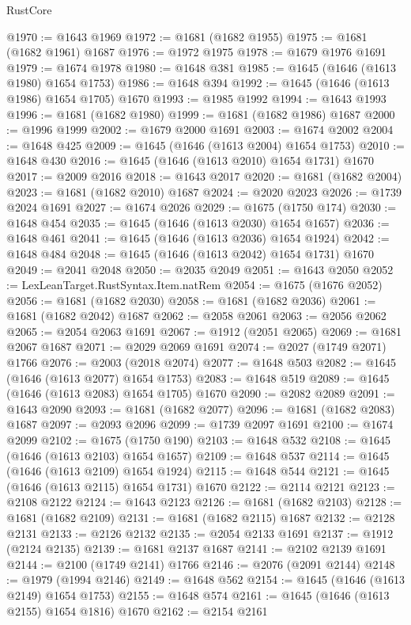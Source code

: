 \begin{lexlean}{RustCore}
\begin{coremodule}
@1970 := @1643 @1969
@1972 := @1681 (@1682 @1955)
@1975 := @1681 (@1682 @1961) @1687
@1976 := @1972 @1975
@1978 := @1679 @1976 @1691
@1979 := @1674 @1978
@1980 := @1648 @381
@1985 := @1645 (@1646 (@1613 @1980) @1654 @1753)
@1986 := @1648 @394
@1992 := @1645 (@1646 (@1613 @1986) @1654 @1705) @1670
@1993 := @1985 @1992
@1994 := @1643 @1993
@1996 := @1681 (@1682 @1980)
@1999 := @1681 (@1682 @1986) @1687
@2000 := @1996 @1999
@2002 := @1679 @2000 @1691
@2003 := @1674 @2002
@2004 := @1648 @425
@2009 := @1645 (@1646 (@1613 @2004) @1654 @1753)
@2010 := @1648 @430
@2016 := @1645 (@1646 (@1613 @2010) @1654 @1731) @1670
@2017 := @2009 @2016
@2018 := @1643 @2017
@2020 := @1681 (@1682 @2004)
@2023 := @1681 (@1682 @2010) @1687
@2024 := @2020 @2023
@2026 := @1739 @2024 @1691
@2027 := @1674 @2026
@2029 := @1675 (@1750 @174)
@2030 := @1648 @454
@2035 := @1645 (@1646 (@1613 @2030) @1654 @1657)
@2036 := @1648 @461
@2041 := @1645 (@1646 (@1613 @2036) @1654 @1924)
@2042 := @1648 @484
@2048 := @1645 (@1646 (@1613 @2042) @1654 @1731) @1670
@2049 := @2041 @2048
@2050 := @2035 @2049
@2051 := @1643 @2050
@2052 := LexLeanTarget.RustSyntax.Item.natRem
@2054 := @1675 (@1676 @2052)
@2056 := @1681 (@1682 @2030)
@2058 := @1681 (@1682 @2036)
@2061 := @1681 (@1682 @2042) @1687
@2062 := @2058 @2061
@2063 := @2056 @2062
@2065 := @2054 @2063 @1691
@2067 := @1912 (@2051 @2065)
@2069 := @1681 @2067 @1687
@2071 := @2029 @2069 @1691
@2074 := @2027 (@1749 @2071) @1766
@2076 := @2003 (@2018 @2074)
@2077 := @1648 @503
@2082 := @1645 (@1646 (@1613 @2077) @1654 @1753)
@2083 := @1648 @519
@2089 := @1645 (@1646 (@1613 @2083) @1654 @1705) @1670
@2090 := @2082 @2089
@2091 := @1643 @2090
@2093 := @1681 (@1682 @2077)
@2096 := @1681 (@1682 @2083) @1687
@2097 := @2093 @2096
@2099 := @1739 @2097 @1691
@2100 := @1674 @2099
@2102 := @1675 (@1750 @190)
@2103 := @1648 @532
@2108 := @1645 (@1646 (@1613 @2103) @1654 @1657)
@2109 := @1648 @537
@2114 := @1645 (@1646 (@1613 @2109) @1654 @1924)
@2115 := @1648 @544
@2121 := @1645 (@1646 (@1613 @2115) @1654 @1731) @1670
@2122 := @2114 @2121
@2123 := @2108 @2122
@2124 := @1643 @2123
@2126 := @1681 (@1682 @2103)
@2128 := @1681 (@1682 @2109)
@2131 := @1681 (@1682 @2115) @1687
@2132 := @2128 @2131
@2133 := @2126 @2132
@2135 := @2054 @2133 @1691
@2137 := @1912 (@2124 @2135)
@2139 := @1681 @2137 @1687
@2141 := @2102 @2139 @1691
@2144 := @2100 (@1749 @2141) @1766
@2146 := @2076 (@2091 @2144)
@2148 := @1979 (@1994 @2146)
@2149 := @1648 @562
@2154 := @1645 (@1646 (@1613 @2149) @1654 @1753)
@2155 := @1648 @574
@2161 := @1645 (@1646 (@1613 @2155) @1654 @1816) @1670
@2162 := @2154 @2161

\end{coremodule}
\end{lexlean}
